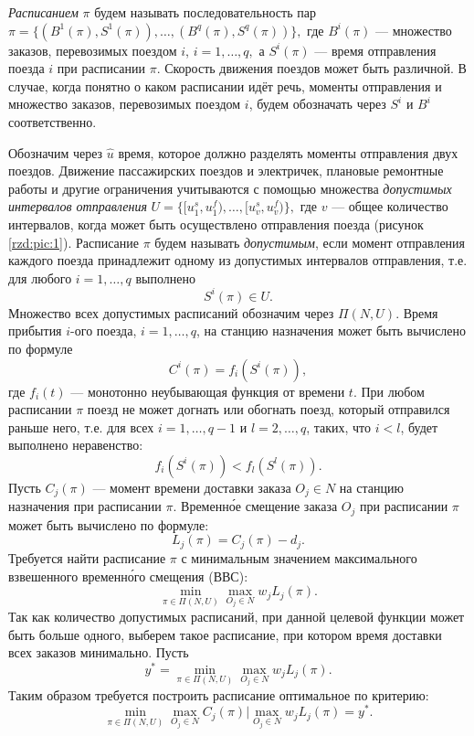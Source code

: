 \textit{Расписанием} $\pi$ будем называть последовательность пар $\pi = \{(B^1(\pi), S^1(\pi)), \dots, (B^q(\pi), S^q(\pi))\},$ где $B^i(\pi)$ --- множество заказов, перевозимых поездом $i$, $i=1, \dots, q,$ а $S^i(\pi)$ --- время отправления поезда $i$ при расписании $\pi$. Скорость движения поездов может быть различной. В случае, когда понятно о каком расписании идёт речь, моменты отправления и множество заказов, перевозимых поездом $i$, будем обозначать через $S^i$ и $B^i$ соответственно.

Обозначим через $\widehat{u}$ время, которое должно разделять моменты отправления двух поездов. Движение пассажирских поездов и электричек, плановые ремонтные работы и другие ограничения учитываются с помощью множества \textit{допустимых интервалов отправления} $U = \{[u_1^s, u_1^f), \dots, [u_v^s, u_v^f)\},$ где $v$ --- общее количество интервалов, когда может быть осуществлено отправления поезда (рисунок \ref{rzd:pic:1}). Расписание $\pi$ будем называть \textit{допустимым}, если момент отправления каждого поезда принадлежит одному из допустимых интервалов отправления, т.е. для любого $i = 1, \dots, q$ выполнено
$$S^i(\pi) \in U.$$
Множество всех допустимых расписаний обозначим через $\Pi(N, U)$. Время прибытия $i$-ого поезда, $i=1, \dots, q$, на станцию назначения может быть вычислено по формуле
$$C^i(\pi) = f_i(S^i(\pi)),$$
где $f_i(t)$ --- монотонно неубывающая функция от времени $t$. При любом расписании $\pi$ поезд не может догнать или обогнать поезд, который отправился раньше него, т.е. для всех $i=1, \dots, q-1$ и $l=2, \dots, q$, таких, что $i<l$, будет выполнено неравенство:
\begin{equation}\label{rzd:eq:0}
f_i(S^i(\pi)) < f_l(S^l(\pi)).
\end{equation}
Пусть $C_j(\pi)$ --- момент времени доставки заказа $O_j \in N$ на станцию назначения при расписании $\pi$. Временн\'{о}е смещение заказа $O_j$ при расписании $\pi$ может быть вычислено по формуле:
$$L_j(\pi) = C_j(\pi) - d_j.$$
Требуется найти расписание $\pi$ с минимальным значением максимального взвешенного временн\'{о}го смещения (ВВС):
\begin{equation*}
  \min\limits_{\pi \in \Pi(N,U)}\max\limits_{O_j\in N}w_j L_j(\pi).
\end{equation*}
Так как количество допустимых расписаний, при данной целевой функции может быть больше одного, выберем такое расписание, при котором время доставки всех заказов минимально. Пусть
$$y^* = \min\limits_{\pi \in \Pi(N,U)}\max\limits_{O_j\in N} w_j L_j(\pi).$$
Таким образом требуется построить расписание оптимальное по критерию:
\begin{equation}\label{rzd:eq:1}
  \min\limits_{\pi \in \Pi(N,U)} \max\limits_{O_j\in N} C_j(\pi) | \max\limits_{O_j \in N} w_j L_j(\pi) = y^*.
\end{equation}

